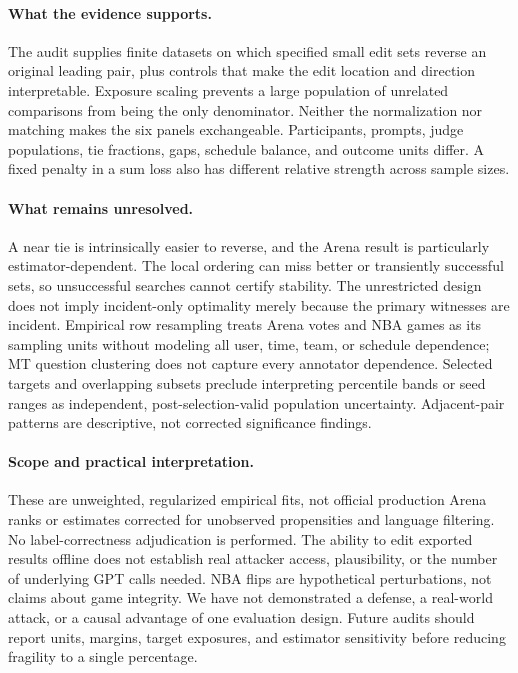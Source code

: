 \documentclass{article}
\begin{document}
\paragraph{What the evidence supports.}
The audit supplies finite datasets on which specified small edit sets reverse an original leading pair, plus controls that make the edit location and direction interpretable. Exposure scaling prevents a large population of unrelated comparisons from being the only denominator. Neither the normalization nor matching makes the six panels exchangeable. Participants, prompts, judge populations, tie fractions, gaps, schedule balance, and outcome units differ. A fixed penalty in a sum loss also has different relative strength across sample sizes.

\paragraph{What remains unresolved.}
A near tie is intrinsically easier to reverse, and the Arena result is particularly estimator-dependent. The local ordering can miss better or transiently successful sets, so unsuccessful searches cannot certify stability. The unrestricted design does not imply incident-only optimality merely because the primary witnesses are incident. Empirical row resampling treats Arena votes and NBA games as its sampling units without modeling all user, time, team, or schedule dependence; MT question clustering does not capture every annotator dependence. Selected targets and overlapping subsets preclude interpreting percentile bands or seed ranges as independent, post-selection-valid population uncertainty. Adjacent-pair patterns are descriptive, not corrected significance findings.

\paragraph{Scope and practical interpretation.}
These are unweighted, regularized empirical fits, not official production Arena ranks or estimates corrected for unobserved propensities and language filtering. No label-correctness adjudication is performed. The ability to edit exported results offline does not establish real attacker access, plausibility, or the number of underlying GPT calls needed. NBA flips are hypothetical perturbations, not claims about game integrity. We have not demonstrated a defense, a real-world attack, or a causal advantage of one evaluation design. Future audits should report units, margins, target exposures, and estimator sensitivity before reducing fragility to a single percentage.
\end{document}
